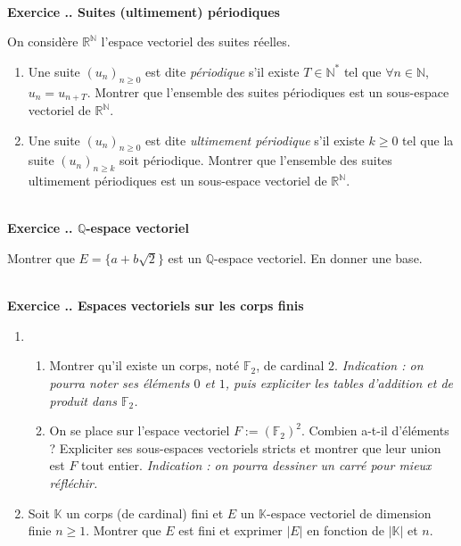 \documentclass{article}
\newcommand{\mb}[1]{\mathbb{#1}}
\newcounter{exo}
\newcommand{\exercice}[1][\null]{\textbf{\\ Exercice \thesection.\theexo. #1} \addtocounter{exo}{1}}
\begin{document}
\exercice[Suites (ultimement) périodiques]

On considère $\mb{R}^{\mb{N}}$ l'espace vectoriel des suites réelles. 
\begin{enumerate}

\item Une suite $(u_n)_{n \ge 0}$ est dite \emph{périodique} s'il existe $T \in \mb{N}^*$ tel que $\forall n \in \mb{N}$, $u_{n} = u_{n+T}$. Montrer que l'ensemble des suites périodiques est un sous-espace vectoriel de $\mb{R}^{\mb{N}}$.

\item Une suite $(u_n)_{n \ge 0}$ est dite \emph{ultimement périodique} s'il existe $k \ge 0$ tel que la suite $(u_n)_{n \ge k}$ soit périodique. Montrer que l'ensemble des suites ultimement périodiques est un sous-espace vectoriel de $\mb{R}^{\mb{N}}$.

\end{enumerate}

\exercice[$\mb{Q}$-espace vectoriel]

Montrer que $E = \{a + b \sqrt{2}\}$ est un $\mb{Q}$-espace vectoriel. En donner une base.

\exercice[Espaces vectoriels sur les corps finis]

\begin{enumerate}

\item \begin{enumerate} \item Montrer qu'il existe un corps, noté $\mb{F}_2$, de cardinal $2$. \emph{Indication : on pourra noter ses éléments $0$ et $1$, puis expliciter les tables d'addition et de produit dans $\mb{F}_2$.}

\item On se place sur l'espace vectoriel $F := (\mb{F}_2)^2$. Combien a-t-il d'éléments ? Expliciter ses sous-espaces vectoriels stricts et montrer que leur union est $F$ tout entier. \emph{Indication : on pourra dessiner un carré pour mieux réfléchir.}

\end{enumerate}


\item Soit $\mb{K}$ un corps (de cardinal) fini et $E$ un $\mb{K}$-espace vectoriel de dimension finie $n \ge 1$. Montrer que $E$ est fini et exprimer $|E|$ en fonction de $|\mb{K}|$ et $n$.


\end{enumerate}
\end{document}
